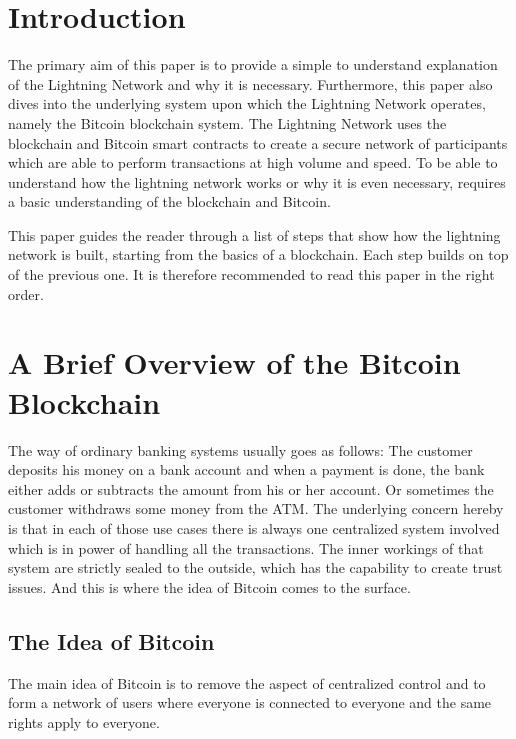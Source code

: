 \documentclass[a4paper, 12pt]{report}
\begin{document}

\chapter{Introduction}
\par The primary aim of this paper is to provide a simple to understand explanation of the Lightning Network and why it is necessary. Furthermore, this paper also dives into the underlying system upon which the Lightning Network operates, namely the Bitcoin blockchain system. The Lightning Network uses the blockchain and Bitcoin smart contracts to create a secure network of participants which are able to perform transactions at high volume and speed. To be able to understand how the lightning network works or why it is even necessary, requires a basic understanding of the blockchain and Bitcoin.
\par This paper guides the reader through a list of steps that show how the lightning network is built, starting from the basics of a blockchain. Each step builds on top of the previous one. It is therefore recommended to read this paper in the right order.

\chapter{A Brief Overview of the Bitcoin Blockchain}
\par The way of ordinary banking systems usually goes as follows: The customer deposits his money on a bank account and when a payment is done, the bank either adds or subtracts the amount from his or her account. Or sometimes the customer withdraws some money from the ATM. The underlying concern hereby is that in each of those use cases there is always one centralized system involved which is in power of handling all the transactions. The inner workings of that system are strictly sealed to the outside, which has the capability to create trust issues. And this is where the idea of Bitcoin comes to the surface.

\section{The Idea of Bitcoin}
\par The main idea of Bitcoin is to remove the aspect of centralized control and to form a network of users where everyone is connected to everyone and the same rights apply to everyone.  
\end{document}
